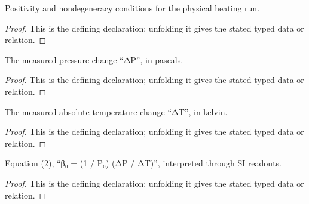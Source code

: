 \begin{definition}[PhysicalAdmissibility]
  \label{decl:physics:IPhO_2026_4_A_5:PhysicalAdmissibility}
  Positivity and nondegeneracy conditions for the physical heating run.
\end{definition}
\begin{proof}
  This is the defining declaration; unfolding it gives the stated typed data or relation.
\end{proof}

\begin{definition}[pressureChangePascal]
  \label{decl:physics:IPhO_2026_4_A_5:pressureChangePascal}
  The measured pressure change “ΔP”, in pascals.
\end{definition}
\begin{proof}
  This is the defining declaration; unfolding it gives the stated typed data or relation.
\end{proof}

\begin{definition}[temperatureChangeKelvin]
  \label{decl:physics:IPhO_2026_4_A_5:temperatureChangeKelvin}
  The measured absolute-temperature change “ΔT”, in kelvin.
\end{definition}
\begin{proof}
  This is the defining declaration; unfolding it gives the stated typed data or relation.
\end{proof}

\begin{definition}[MatchesCoefficientDefinition]
  \label{decl:physics:IPhO_2026_4_A_5:MatchesCoefficientDefinition}
  Equation (2), “β₀ = (1 / P₀) (ΔP / ΔT)”, interpreted through SI readouts.
\end{definition}
\begin{proof}
  This is the defining declaration; unfolding it gives the stated typed data or relation.
\end{proof}

